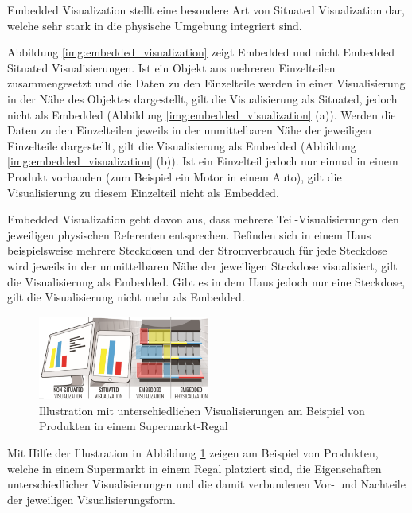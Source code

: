 Embedded Visualization stellt eine besondere Art von Situated Visualization dar, welche sehr stark in die physische Umgebung integriert sind. \cite[S.~195]{Marriott2018}

Abbildung \ref{img:embedded_visualization} zeigt Embedded und nicht Embedded Situated Visualisierungen. Ist ein Objekt aus mehreren Einzelteilen 
zusammengesetzt und die Daten zu den Einzelteile werden in einer Visualisierung in der Nähe des Objektes dargestellt, gilt die Visualisierung als Situated, jedoch nicht als Embedded (Abbildung \ref{img:embedded_visualization} (a)). \cite[S.~202]{Marriott2018}
Werden die Daten zu den Einzelteilen jeweils in der unmittelbaren Nähe der jeweiligen Einzelteile dargestellt, gilt die Visualisierung als Embedded (Abbildung \ref{img:embedded_visualization} (b)). Ist ein Einzelteil jedoch nur einmal in einem Produkt vorhanden (zum Beispiel ein Motor in einem Auto), gilt die Visualisierung zu diesem Einzelteil nicht als Embedded. 

Embedded Visualization geht davon aus, dass mehrere Teil-Visualisierungen den jeweiligen physischen Referenten entsprechen. Befinden sich in einem Haus beispielsweise mehrere Steckdosen und der Stromverbrauch 
für jede Steckdose wird jeweils in der unmittelbaren Nähe der jeweiligen Steckdose visualisiert, gilt die Visualisierung als Embedded. Gibt es in dem Haus jedoch nur eine Steckdose, gilt die Visualisierung nicht mehr als
Embedded.

\vspace{15mm} 
\begin{figure}[H]
	\centering
	\includegraphics[width=0.5\textwidth]{resources/fundamentals/situated_visualization/Illustration_situated_embedded_visualization.png}
	\caption{Illustration mit unterschiedlichen Visualisierungen am Beispiel von Produkten in einem Supermarkt-Regal}
	\label{img:Illustration_situated_embedded_visualization}
\end{figure}

Mit Hilfe der Illustration in Abbildung \ref{img:Illustration_situated_embedded_visualization} zeigen \citeauthor{Willett2017} am Beispiel von Produkten, 
welche in einem Supermarkt in einem Regal platziert sind, die Eigenschaften unterschiedlicher Visualisierungen und die damit verbundenen Vor- und Nachteile der jeweiligen Visualisierungsform. 


